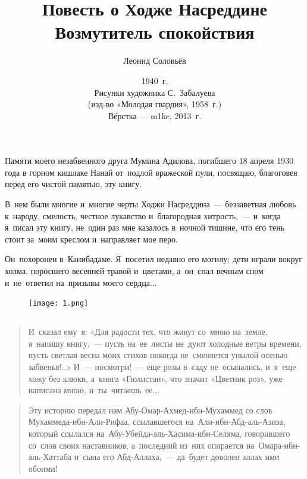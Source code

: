 \documentclass[12pt,a4paper]{book}
\title{\textbf{Повесть о Ходже Насреддине} \\ Возмутитель спокойствия}
\author{Леонид Соловьёв}
\date{1940~г. \\ Рисунки художника С.~Забалуева \\ (изд-во «Молодая гвардия», 1958~г.) \\ Вёрстка --- m1kc, 2013~г.}
\begin{document}
\maketitle

Памяти моего незабвенного друга Мумина Адилова, погибшего 18 апреля 1930 года в горном кишлаке Нанай от~подлой вражеской пули, посвящаю, благоговея перед его чистой памятью, эту книгу.

В~нем были многие и~многие черты Ходжи Насреддина~— беззаветная любовь к~народу, смелость, честное лукавство и~благородная хитрость,~— и~когда я~писал эту книгу, не~один раз мне казалось в~ночной тишине, что его тень стоит за~моим креслом и~направляет мое перо.

Он~похоронен в~Канибадаме. Я~посетил недавно его могилу; дети играли вокруг холма, поросшего весенней травой и~цветами, а~он~спал вечным сном и~не~ответил на~призывы моего сердца...

\begin{figure}[p]
\centering
\texttt{[image: 1.png]}
\end{figure}

\chapter*{}

\begin{quote}
И~сказал ему~я: «Для радости тех, что живут со~мною на~земле, я~напишу книгу,~— пусть на~ее~листы не~дуют холодные ветры времени, пусть светлая весна моих стихов никогда не~сменяется унылой осенью забвенья!..» И~— посмотри!~— еще розы в~саду не~осыпались, и~я~еще хожу без клюки, а~книга «Гюлистан», что значит «Цветник роз», уже написана мною, и~ты~читаешь~ее...
\end{quote}

\begin{quote}
Эту историю передал нам Абу-Омар-Ахмед-ибн-Мухаммед со слов Мухаммеда-ибн-Али-Рифаа, ссылавшегося на~Али-ибн-Абд-аль-Азиза, который ссылался на~Абу-Убейда-аль-Хасима-ибн-Селяма, говорившего со~слов своих наставников, а~последний из~них опирается на~Омара-ибн-аль-Хаттаба и~сына его Абд-Аллаха,~— да~будет доволен аллах ими обоими!
\end{quote}

\part{}
\end{document}
